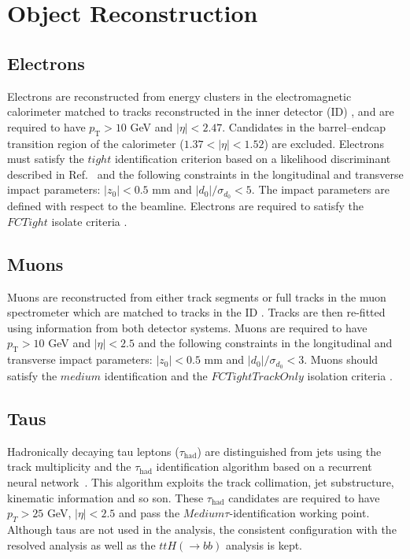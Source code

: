 \section{Object Reconstruction}
\label{sec:ObjectReco}

\subsection{Electrons}
\label{subsec:Electrons}
Electrons are reconstructed from energy clusters in the electromagnetic calorimeter matched to tracks reconstructed in the inner detector (ID) \cite{PERF-2013-03,ATLAS-CONF-2016-024}, and are required to have $p_\text{T}>10$ GeV and $|\eta|<2.47$. Candidates in the barrel--endcap transition region of the calorimeter ($1.37<|\eta|<1.52$) are excluded. Electrons must satisfy the $tight$ identification criterion based on a likelihood discriminant described in Ref.~\cite{ATLAS-CONF-2016-024} and the following constraints in the longitudinal and transverse impact parameters: $|z_{0}|<0.5$ mm and $|d_{0}|/\sigma_{d_{0}}<5$. The impact parameters are defined with respect to the beamline. Electrons are required to satisfy the $FCTight$ isolate criteria \cite{IsolationSelectionTool}.

\subsection{Muons}
\label{subsec:Muons}
Muons are reconstructed from either track segments or full tracks in the muon spectrometer which are matched to tracks in the ID \cite{PERF-2015-10}. Tracks are then re-fitted using information from both detector systems. Muons are required to have $p_\text{T}>10$ GeV and $|\eta|<2.5$ and the following constraints in the longitudinal and transverse impact parameters: $|z_{0}|<0.5$ mm and $|d_{0}|/\sigma_{d_{0}}<3$. Muons should satisfy the $medium$ identification and the $FCTightTrackOnly$ isolation criteria \cite{IsolationSelectionTool}.
\subsection{Taus}
\label{subsec:Taus}
Hadronically decaying tau leptons ($\tau_{\text{had}}$) are distinguished from jets using the track multiplicity and the $\tau_\text{had}$ identification algorithm based on a recurrent neural network~\cite{ATL-PHYS-PUB-2015-045}. This algorithm exploits the track collimation, jet substructure, kinematic information and so son. These $\tau_{\text{had}}$ candidates are required to have $p_{T}>25$ GeV, $|\eta|<2.5$ and pass the $Medium \tau$-identification working point. Although taus are not used in the analysis, the consistent configuration with the resolved analysis as well as the $ttH(\to bb)$ analysis is kept.
